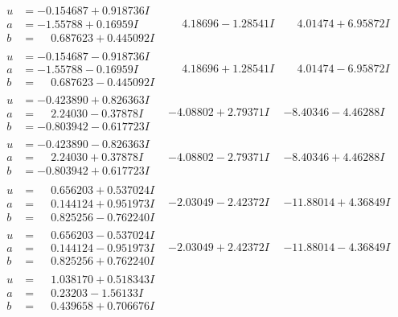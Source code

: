 \documentclass[1p]{elsarticle_modified}
\theoremstyle{definition}
\begin{document}
$$\begin{array}{c|c|c}
\begin{aligned}
u &= -0.154687 + 0.918736 I \\
a &= -1.55788 + 0.16959 I \\
b &= \phantom{-}0.687623 + 0.445092 I\end{aligned}
 & \phantom{-}4.18696 - 1.28541 I & \phantom{-}4.01474 + 6.95872 I \\ \hline\begin{aligned}
u &= -0.154687 - 0.918736 I \\
a &= -1.55788 - 0.16959 I \\
b &= \phantom{-}0.687623 - 0.445092 I\end{aligned}
 & \phantom{-}4.18696 + 1.28541 I & \phantom{-}4.01474 - 6.95872 I \\ \hline\begin{aligned}
u &= -0.423890 + 0.826363 I \\
a &= \phantom{-}2.24030 - 0.37878 I \\
b &= -0.803942 - 0.617723 I\end{aligned}
 & -4.08802 + 2.79371 I & -8.40346 - 4.46288 I \\ \hline\begin{aligned}
u &= -0.423890 - 0.826363 I \\
a &= \phantom{-}2.24030 + 0.37878 I \\
b &= -0.803942 + 0.617723 I\end{aligned}
 & -4.08802 - 2.79371 I & -8.40346 + 4.46288 I \\ \hline\begin{aligned}
u &= \phantom{-}0.656203 + 0.537024 I \\
a &= \phantom{-}0.144124 + 0.951973 I \\
b &= \phantom{-}0.825256 - 0.762240 I\end{aligned}
 & -2.03049 - 2.42372 I & -11.88014 + 4.36849 I \\ \hline\begin{aligned}
u &= \phantom{-}0.656203 - 0.537024 I \\
a &= \phantom{-}0.144124 - 0.951973 I \\
b &= \phantom{-}0.825256 + 0.762240 I\end{aligned}
 & -2.03049 + 2.42372 I & -11.88014 - 4.36849 I \\ \hline\begin{aligned}
u &= \phantom{-}1.038170 + 0.518343 I \\
a &= \phantom{-}0.23203 - 1.56133 I \\
b &= \phantom{-}0.439658 + 0.706676 I\end{aligned}

\end{array}$$
\end{document}
